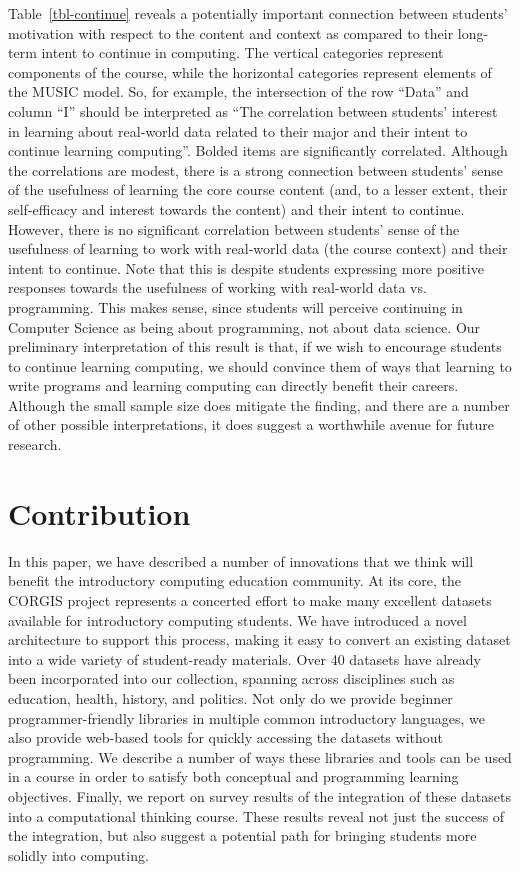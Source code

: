 \documentclass{sig-alternate}
\begin{document}
Table~\ref{tbl-continue} reveals a potentially important connection between students' motivation with respect to the content and context as compared to their long-term intent to continue in computing.
The vertical categories represent components of the course, while the horizontal categories represent elements of the MUSIC model.
So, for example, the intersection of the row ``Data'' and column ``I'' should be interpreted as ``The correlation between students' interest in learning about real-world data related to their major and their intent to continue learning computing''.
Bolded items are significantly correlated.
Although the correlations are modest, there is a strong connection between students' sense of the usefulness of learning the core course content (and, to a lesser extent, their self-efficacy and interest towards the content) and their intent to continue.
However, there is no significant correlation between students' sense of the usefulness of learning to work with real-world data (the course context) and their intent to continue.
Note that this is despite students expressing more positive responses towards the usefulness of working with real-world data vs. programming.
This makes sense, since students will perceive continuing in Computer Science as being about programming, not about data science.
Our preliminary interpretation of this result is that, if we wish to encourage students to continue learning computing, we should convince them of ways that learning to write programs and learning computing can directly benefit their careers.
Although the small sample size does mitigate the finding, and there are a number of other possible interpretations, it does suggest a worthwhile avenue for future research.

\section{Contribution}

In this paper, we have described a number of innovations that we think will benefit the introductory computing education community.
At its core, the CORGIS project represents a concerted effort to make many excellent datasets available for introductory computing students.
We have introduced a novel architecture to support this process, making it easy to convert an existing dataset into a wide variety of student-ready materials.
Over 40 datasets have already been incorporated into our collection, spanning across disciplines such as education, health, history, and politics.
Not only do we provide beginner programmer-friendly libraries in multiple common introductory languages, we also provide web-based tools for quickly accessing the datasets without programming.
We describe a number of ways these libraries and tools can be used in a course in order to satisfy both conceptual and programming learning objectives.
Finally, we report on survey results of the integration of these datasets into a computational thinking course.
These results reveal not just the success of the integration, but also suggest a potential path for bringing students more solidly into computing.
\end{document}
